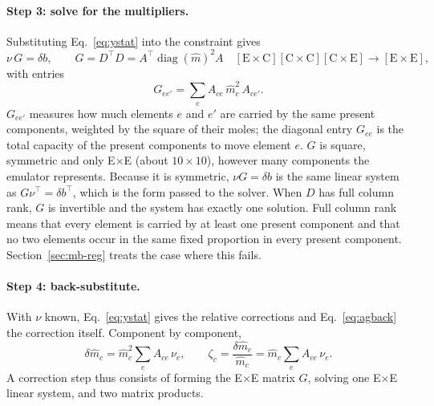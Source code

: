\documentclass[11pt]{article}
\begin{document}
\paragraph{Step 3: solve for the multipliers.} Substituting Eq.~\eqref{eq:ystat} into the
constraint gives
\begin{equation}
  \nu\, G = \delta b,
  \qquad
  G = D^{\!\top} D = A^{\!\top} \operatorname{diag}(\hat m)^2 A
  \quad [\text{E}\times\text{C}][\text{C}\times\text{C}][\text{C}\times\text{E}] \to [\text{E}\times\text{E}],
  \label{eq:dual}
\end{equation}
with entries
\begin{equation}
  G_{ee'} = \sum_c A_{ce}\, \hat m_c^2\, A_{ce'} .
  \label{eq:Gentries}
\end{equation}
$G_{ee'}$ measures how much elements $e$ and $e'$ are carried by the same present
components, weighted by the square of their moles; the diagonal entry $G_{ee}$ is the total
capacity of the present components to move element $e$. $G$ is square, symmetric and only
E$\times$E (about $10\times10$), however many components the emulator represents. Because
it is symmetric, $\nu G = \delta b$ is the same linear system as $G \nu^{\!\top} = \delta b^{\!\top}$,
which is the form passed to the solver. When $D$ has full column rank, $G$ is invertible and
the system has exactly one solution. Full column rank means that every element is carried
by at least one present component and that no two elements occur in the same fixed
proportion in every present component. Section~\ref{sec:mb-reg} treats the case where this
fails.

\paragraph{Step 4: back-substitute.} With $\nu$ known, Eq.~\eqref{eq:ystat} gives the relative
corrections and Eq.~\eqref{eq:agback} the correction itself. Component by component,
\begin{equation}
  \delta\hat m_c = \hat m_c^2 \sum_e A_{ce}\, \nu_e ,
  \qquad
  \zeta_c = \frac{\delta\hat m_c}{\hat m_c} = \hat m_c \sum_e A_{ce}\, \nu_e .
  \label{eq:share}
\end{equation}
A correction step thus consists of forming the E$\times$E matrix $G$, solving one E$\times$E
linear system, and two matrix products.
\end{document}
